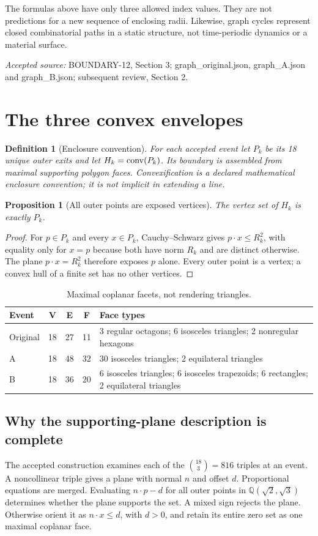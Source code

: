 \documentclass[11pt,a4paper]{article}
\newtheorem{proposition}[theorem]{Proposition}
\newtheorem{definition}[theorem]{Definition}
\newcommand{\source}[1]{\par{\small\emph{Accepted source:} #1}\par}
\begin{document}
The formulas above have only three allowed index values. They are not predictions for a new sequence of enclosing radii. Likewise, graph cycles represent closed combinatorial paths in a static structure, not time-periodic dynamics or a material surface.
\source{BOUNDARY-12, Section 3; graph\_original.json, graph\_A.json and graph\_B.json; subsequent review, Section 2.}

\section{The three convex envelopes}\label{sec:hulls}
\begin{definition}[Enclosure convention]
For each accepted event let $P_k$ be its 18 unique outer exits and let $H_k=\operatorname{conv}(P_k)$. Its boundary is assembled from maximal supporting polygon faces. Convexification is a declared mathematical enclosure convention; it is not implicit in extending a line.
\end{definition}
\begin{proposition}[All outer points are exposed vertices]\label{prop:exposed}
The vertex set of $H_k$ is exactly $P_k$.
\end{proposition}
\begin{proof}
For $p\in P_k$ and every $x\in P_k$, Cauchy--Schwarz gives $p\cdot x\leq R_k^2$, with equality only for $x=p$ because both have norm $R_k$ and are distinct otherwise. The plane $p\cdot x=R_k^2$ therefore exposes $p$ alone. Every outer point is a vertex; a convex hull of a finite set has no other vertices.
\end{proof}

\begin{table}[ht]\centering\small
\caption{Maximal coplanar facets, not rendering triangles.}\label{tab:hulls}
\begin{tabularx}{\linewidth}{@{}lcccX@{}}\toprule
Event&V&E&F&Face types\\\midrule
Original&18&27&11&3 regular octagons; 6 isosceles triangles; 2 nonregular hexagons\\
A&18&48&32&30 isosceles triangles; 2 equilateral triangles\\
B&18&36&20&6 isosceles triangles; 6 isosceles trapezoids; 6 rectangles; 2 equilateral triangles\\\bottomrule
\end{tabularx}
\end{table}

\subsection{Why the supporting-plane description is complete}\label{sub:certificates}
The accepted construction examines each of the $\binom{18}{3}=816$ triples at an event. A noncollinear triple gives a plane with normal $n$ and offset $d$. Proportional equations are merged. Evaluating $n\cdot p-d$ for all outer points in $\mathbb Q(\sqrt2,\sqrt3)$ determines whether the plane supports the set. A mixed sign rejects the plane. Otherwise orient it as $n\cdot x\leq d$, with $d>0$, and retain its entire zero set as one maximal coplanar face.
\end{document}
